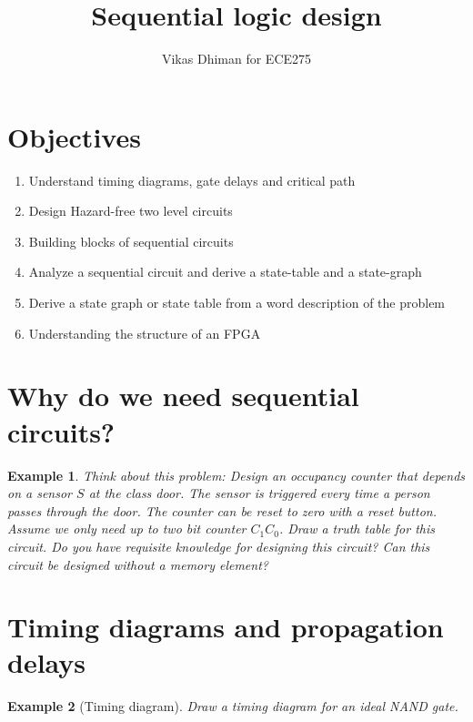 \documentclass{article}
\author{Vikas Dhiman for ECE275}
\title{Sequential logic design}
\newtheorem{example}{Example}
\begin{document}
\maketitle


\section{Objectives}
\begin{enumerate}
  \item Understand timing diagrams, gate delays and critical path
  \item Design Hazard-free two level circuits
  \item Building blocks of sequential circuits
  \item Analyze a sequential circuit and derive a state-table and a state-graph
  \item Derive a state graph or state table from a word description of the problem
  \item Understanding the structure of an FPGA
\end{enumerate}

\section{Why do we need sequential circuits?}

\begin{example}
  Think about this problem: Design an occupancy counter that depends on a
  sensor $S$ at the class door. The sensor is triggered every time a person passes
  through the door. The counter can be reset to zero with a reset button. Assume
  we only need up to two bit counter $C_1C_0$. Draw a truth table for this
  circuit. Do you have requisite knowledge for designing this circuit? Can this
  circuit be designed without a memory element?
\end{example}
\vspace{10em}


\section{Timing diagrams and propagation delays}

\begin{example}[Timing diagram]
  Draw a timing diagram for an ideal NAND gate.
\end{example}
\vspace{20em}
\end{document}
